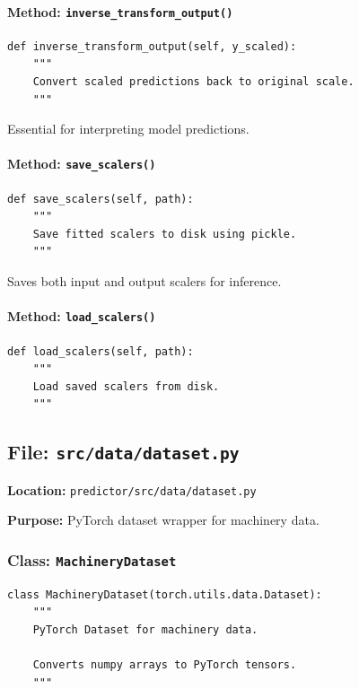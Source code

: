 \documentclass[11pt,a4paper]{article}
\begin{document}
\paragraph{Method: \texttt{inverse\_transform\_output()}}
\begin{lstlisting}
def inverse_transform_output(self, y_scaled):
    """
    Convert scaled predictions back to original scale.
    """
\end{lstlisting}

Essential for interpreting model predictions.

\paragraph{Method: \texttt{save\_scalers()}}
\begin{lstlisting}
def save_scalers(self, path):
    """
    Save fitted scalers to disk using pickle.
    """
\end{lstlisting}

Saves both input and output scalers for inference.

\paragraph{Method: \texttt{load\_scalers()}}
\begin{lstlisting}
def load_scalers(self, path):
    """
    Load saved scalers from disk.
    """
\end{lstlisting}

\subsection{File: \texttt{src/data/dataset.py}}

\textbf{Location:} \texttt{predictor/src/data/dataset.py}

\textbf{Purpose:} PyTorch dataset wrapper for machinery data.

\subsubsection{Class: \texttt{MachineryDataset}}

\begin{lstlisting}
class MachineryDataset(torch.utils.data.Dataset):
    """
    PyTorch Dataset for machinery data.

    Converts numpy arrays to PyTorch tensors.
    """
\end{lstlisting}
\end{document}
